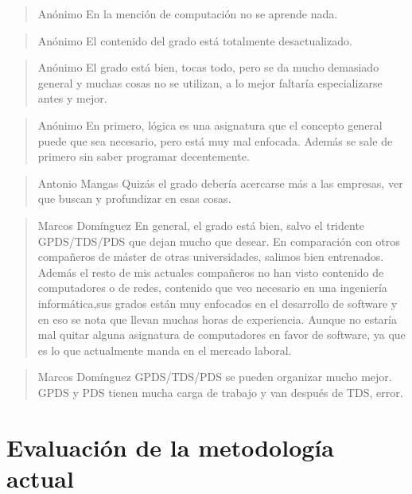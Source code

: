 \begin{quote}{Anónimo}
    En la mención de computación no se aprende nada.
\end{quote}

\begin{quote}{Anónimo}
    El contenido del grado está totalmente desactualizado.
\end{quote}

\begin{quote}{Anónimo}
    El grado está bien, tocas todo, pero se da mucho demasiado general y
    muchas cosas no se utilizan, a lo mejor faltaría especializarse antes
    y mejor.
\end{quote}

\begin{quote}{Anónimo}
    En primero, lógica es una asignatura que el concepto general puede que 
    sea necesario, pero está muy mal enfocada. Además se sale de primero 
    sin saber programar decentemente.
\end{quote}

\begin{quote}{Antonio Mangas}
    Quizás el grado debería acercarse más a las empresas, ver que buscan y 
    profundizar en esas cosas. 
\end{quote}

\begin{quote}{Marcos Domínguez}
    En general, el grado está bien, salvo el tridente GPDS/TDS/PDS que dejan
    mucho que desear. En comparación con otros compañeros de máster de otras
    universidades, salimos bien entrenados. Además el resto de mis actuales
    compañeros no han visto contenido de computadores o de redes, 
    contenido que veo necesario en una ingeniería informática,sus grados
    están muy enfocados en el desarrollo de software y en eso se nota que llevan
    muchas horas de experiencia. Aunque no estaría mal
    quitar alguna asignatura de computadores en favor de software, ya que 
    es lo que actualmente manda en el mercado laboral.
\end{quote}

\begin{quote}{Marcos Domínguez}
    GPDS/TDS/PDS se pueden organizar mucho mejor. GPDS y PDS tienen mucha carga 
    de trabajo y van después de TDS, error.
\end{quote}


\section{Evaluación de la metodología actual}


